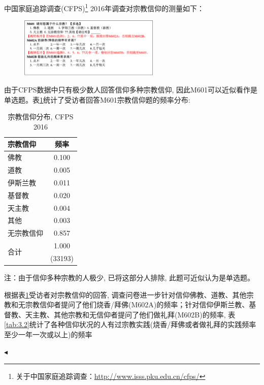 \documentclass[11pt]{article}
\newenvironment{problem}[2][Problem]{\begin{trivlist}
\item[\hskip \labelsep {\bfseries #1}\hskip \labelsep {\bfseries #2.}]\songti}{\hfill$\blacktriangleleft$\end{trivlist}}
\newcommand\1{\mathds{1}}
\begin{document}
\begin{problem}{3}
    中国家庭追踪调查(CFPS)\footnote{关于中国家庭追踪调查：\href{http://www.isss.pku.edu.cn/cfps/}{http://www.isss.pku.edu.cn/cfps/}} 2016年调查对宗教信仰的测量如下：
    \begin{figure}[H]
        \centering
        \includegraphics[width=0.6\textwidth]{./images/3.1.png}
    \end{figure}
    由于CFPS数据中只有极少数人回答信仰多种宗教信仰, 因此M601可以近似看作是单选题。表\ref{tab:3.1}统计了受访者回答M601宗教信仰题的频率分布:
    \begin{table}[H]
        \centering
        \caption{宗教信仰分布, CFPS 2016}
        \label{tab:3.1}
        \begin{tabularx}{0.8\textwidth}{Xc}
            \hline
            \textbf{宗教信仰} & \textbf{频率} \\
            \hline
            佛教 & 0.100 \\
            道教 & 0.005 \\
            伊斯兰教 & 0.011 \\
            基督教 & 0.020 \\
            天主教 & 0.004 \\
            其他 & 0.003 \\
            无宗教信仰 & 0.857 \\
            \multirow{2}{*}{合计} & 1.000 \\
            & (33193) \\
            \hline
        \end{tabularx}
        \begin{tablenotes}
            \footnotesize
            \item 注：由于信仰多种宗教的人极少, 已将这部分人排除, 此题可近似认为是单选题。
        \end{tablenotes}
    \end{table}
    根据表\ref{tab:3.1}受访者对宗教信仰的回答, 调查问卷进一步针对信仰佛教、道教、其他宗教和无宗教信仰者提问了他们烧香/拜佛(M602A)的频率；针对信仰伊斯兰教、基督教、天主教、其他宗教和无信仰者提问了他们做礼拜(M602B)的频率, 表\ref{tab:3.2}统计了各种信仰状况的人有过宗教实践(烧香/拜佛或者做礼拜的实践频率至少一年一次或以上)的频率

\end{problem}
\end{document}
